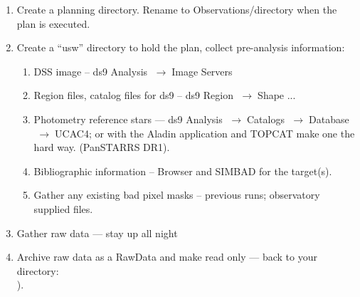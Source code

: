 \documentclass[letter,11pt,oneside]{article}
\newcommand{\menu}{\ensuremath{\;\rightarrow\;}}
\begin{document}
\vspace{-.15cm}
\begin{enumerate}\addtolength{\itemsep}{-0.5\baselineskip}
   \item   Create a planning directory. Rename to Observations/directory
when the plan is executed.
   \item   Create a ``usw'' directory to hold the plan, collect pre-analysis information:
\vspace{-.15cm}
\begin{enumerate}\addtolength{\itemsep}{-0.5\baselineskip}
   \item   DSS image -- ds9 Analysis \menu Image Servers
   \item   Region files, catalog files for ds9 -- ds9 Region \menu Shape ...
   \item   Photometry reference stars --- ds9 Analysis \menu Catalogs \menu Database \menu UCAC4;
or with the Aladin application and TOPCAT make one the hard way. (PanSTARRS DR1).
   \item   Bibliographic information -- Browser and SIMBAD for the target(s).
   \item   Gather any existing bad pixel masks -- previous runs; observatory supplied files.
\end{enumerate}

   \item  Gather raw data --- stay up all night
   \item  Archive raw data as a RawData and make read only --- back to your {\color{verbcolor}{\verb#Observations#}} directory:\\
{\color{verbcolor}{\verb#(cd Observations/YYYYmmDD; mkdir -p RawData; cd RawData; rsync <from somewhere> .; chmod -w -R *#}}).
\end{enumerate}
\end{document}
